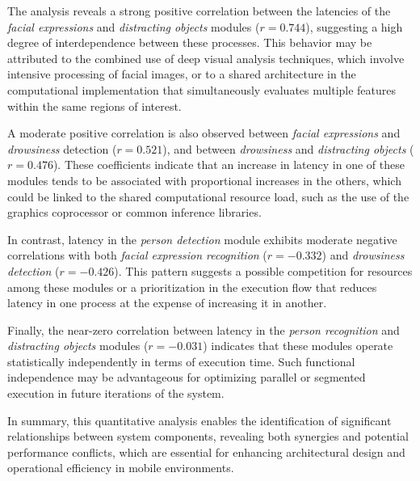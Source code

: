                 The analysis reveals a strong positive correlation between the latencies of the \textit{facial expressions} and \textit{distracting objects} modules (\(r = 0.744\)), suggesting a high degree of interdependence between these processes. This behavior may be attributed to the combined use of deep visual analysis techniques, which involve intensive processing of facial images, or to a shared architecture in the computational implementation that simultaneously evaluates multiple features within the same regions of interest.
                
                A moderate positive correlation is also observed between \textit{facial expressions} and \textit{drowsiness} detection (\(r = 0.521\)), and between \textit{drowsiness} and \textit{distracting objects} (\(r = 0.476\)). These coefficients indicate that an increase in latency in one of these modules tends to be associated with proportional increases in the others, which could be linked to the shared computational resource load, such as the use of the graphics coprocessor or common inference libraries.
                
                In contrast, latency in the \textit{person detection} module exhibits moderate negative correlations with both \textit{facial expression recognition} (\(r = {-}0.332\)) and \textit{drowsiness detection} (\(r = {-}0.426\)). This pattern suggests a possible competition for resources among these modules or a prioritization in the execution flow that reduces latency in one process at the expense of increasing it in another.
                
                Finally, the near-zero correlation between latency in the \textit{person recognition} and \textit{distracting objects} modules (\(r = -0.031\)) indicates that these modules operate statistically independently in terms of execution time. Such functional independence may be advantageous for optimizing parallel or segmented execution in future iterations of the system.
                
                In summary, this quantitative analysis enables the identification of significant relationships between system components, revealing both synergies and potential performance conflicts, which are essential for enhancing architectural design and operational efficiency in mobile environments.
                

